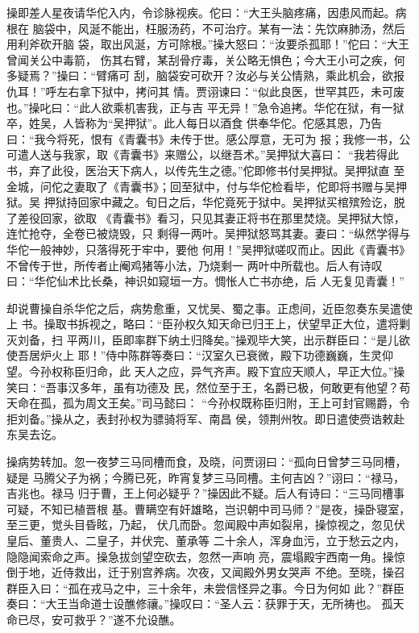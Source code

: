 操即差人星夜请华佗入内，令诊脉视疾。佗曰：“大王头脑疼痛，因患风而起。病根在
脑袋中，风涎不能出，枉服汤药，不可治疗。某有一法：先饮麻肺汤，然后用利斧砍开脑
袋，取出风涎，方可除根。”操大怒曰：“汝要杀孤耶！”佗曰：“大王曾闻关公中毒箭，
伤其右臂，某刮骨疗毒，关公略无惧色；今大王小可之疾，何多疑焉？”操曰：“臂痛可
刮，脑袋安可砍开？汝必与关公情熟，乘此机会，欲报仇耳！”呼左右拿下狱中，拷问其
情。贾诩谏曰：“似此良医，世罕其匹，未可废也。”操叱曰：“此人欲乘机害我，正与吉
平无异！”急令追拷。华佗在狱，有一狱卒，姓吴，人皆称为“吴押狱”。此人每日以酒食
供奉华佗。佗感其恩，乃告曰：“我今将死，恨有《青囊书》未传于世。感公厚意，无可为
报；我修一书，公可遣人送与我家，取《青囊书》来赠公，以继吾术。”吴押狱大喜曰：
“我若得此书，弃了此役，医治天下病人，以传先生之德。”佗即修书付吴押狱。吴押狱直
至金城，问佗之妻取了《青囊书》；回至狱中，付与华佗检看毕，佗即将书赠与吴押狱。吴
押狱持回家中藏之。旬日之后，华佗竟死于狱中。吴押狱买棺殡殓讫，脱了差役回家，欲取
《青囊书》看习，只见其妻正将书在那里焚烧。吴押狱大惊，连忙抢夺，全卷已被烧毁，只
剩得一两叶。吴押狱怒骂其妻。妻曰：“纵然学得与华佗一般神妙，只落得死于牢中，要他
何用！”吴押狱嗟叹而止。因此《青囊书》不曾传于世，所传者止阉鸡猪等小法，乃烧剩一
两叶中所载也。后人有诗叹曰：“华佗仙术比长桑，神识如窥垣一方。惆怅人亡书亦绝，后
人无复见青囊！”

却说曹操自杀华佗之后，病势愈重，又忧吴、蜀之事。正虑间，近臣忽奏东吴遣使上
书。操取书拆视之，略曰：“臣孙权久知天命已归王上，伏望早正大位，遣将剿灭刘备，扫
平两川，臣即率群下纳土归降矣。”操观毕大笑，出示群臣曰：“是儿欲使吾居炉火上
耶！”侍中陈群等奏曰：“汉室久已衰微，殿下功德巍巍，生灵仰望。今孙权称臣归命，此
天人之应，异气齐声。殿下宜应天顺人，早正大位。”操笑曰：“吾事汉多年，虽有功德及
民，然位至于王，名爵已极，何敢更有他望？苟天命在孤，孤为周文王矣。”司马懿曰：
“今孙权既称臣归附，王上可封官赐爵，令拒刘备。”操从之，表封孙权为骠骑将军、南昌
侯，领荆州牧。即日遣使赍诰敕赴东吴去讫。

操病势转加。忽一夜梦三马同槽而食，及晓，问贾诩曰：“孤向日曾梦三马同槽，疑是
马腾父子为祸；今腾已死，昨宵复梦三马同槽。主何吉凶？”诩曰：“禄马，吉兆也。禄马
归于曹，王上何必疑乎？”操因此不疑。后人有诗曰：“三马同槽事可疑，不知已植晋根
基。曹瞒空有奸雄略，岂识朝中司马师？”是夜，操卧寝室，至三更，觉头目昏眩，乃起，
伏几而卧。忽闻殿中声如裂帛，操惊视之，忽见伏皇后、董贵人、二皇子，并伏完、董承等
二十余人，浑身血污，立于愁云之内，隐隐闻索命之声。操急拔剑望空砍去，忽然一声响
亮，震塌殿宇西南一角。操惊倒于地，近侍救出，迁于别宫养病。次夜，又闻殿外男女哭声
不绝。至晓，操召群臣入曰：“孤在戎马之中，三十余年，未尝信怪异之事。今日为何如
此？”群臣奏曰：“大王当命道士设醮修禳。”操叹曰：“圣人云：获罪于天，无所祷也。
孤天命已尽，安可救乎？”遂不允设醮。

